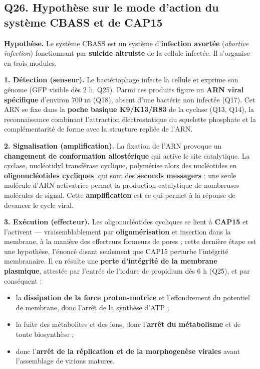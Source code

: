 \documentclass[11pt,a4paper]{article}
\providecommand{\tightlist}{\setlength{\itemsep}{0pt}\setlength{\parskip}{0pt}}
\begin{document}
\hypertarget{q26.-hypothuxe8se-sur-le-mode-daction-du-systuxe8me-cbass-et-de-cap15}{%
\subsection{Q26. Hypothèse sur le mode d'action du système CBASS et de CAP15}\label{q26.-hypothuxe8se-sur-le-mode-daction-du-systuxe8me-cbass-et-de-cap15}}

\textbf{Hypothèse.} Le système CBASS est un système d'\textbf{infection avortée} (\emph{abortive infection}) fonctionnant par \textbf{suicide altruiste} de la cellule infectée. Il s'organise en trois modules.

\textbf{1. Détection (senseur).} Le bactériophage infecte la cellule et exprime son génome (GFP visible dès 2 h, Q25). Parmi ces produits figure un \textbf{ARN viral spécifique} d'environ 700 nt (Q18), absent d'une bactérie non infectée (Q17). Cet ARN se fixe dans la \textbf{poche basique K9/K13/R83} de la cyclase (Q13, Q14), la reconnaissance combinant l'attraction électrostatique du squelette phosphate et la complémentarité de forme avec la structure repliée de l'ARN.

\textbf{2. Signalisation (amplification).} La fixation de l'ARN provoque un \textbf{changement de conformation allostérique} qui active le site catalytique. La cyclase, nucléotidyl transférase cyclique, polymérise alors des nucléotides en \textbf{oligonucléotides cycliques}, qui sont des \textbf{seconds messagers} : une seule molécule d'ARN activatrice permet la production catalytique de nombreuses molécules de signal. Cette \textbf{amplification} est ce qui permet à la réponse de devancer le cycle viral.

\textbf{3. Exécution (effecteur).} Les oligonucléotides cycliques se lient à \textbf{CAP15} et l'activent --- vraisemblablement par \textbf{oligomérisation} et insertion dans la membrane, à la manière des effecteurs formeurs de pores ; cette dernière étape est une hypothèse, l'énoncé disant seulement que CAP15 perturbe l'intégrité membranaire. Il en résulte une \textbf{perte d'intégrité de la membrane plasmique}, attestée par l'entrée de l'iodure de propidium dès 6 h (Q25), et par conséquent :

\begin{itemize}
\tightlist
\item
  la \textbf{dissipation de la force proton-motrice} et l'effondrement du potentiel de membrane, donc l'arrêt de la synthèse d'ATP ;
\item
  la fuite des métabolites et des ions, donc l'\textbf{arrêt du métabolisme} et de toute biosynthèse ;
\item
  donc l'\textbf{arrêt de la réplication et de la morphogenèse virales} avant l'assemblage de virions matures.
\end{itemize}
\end{document}
